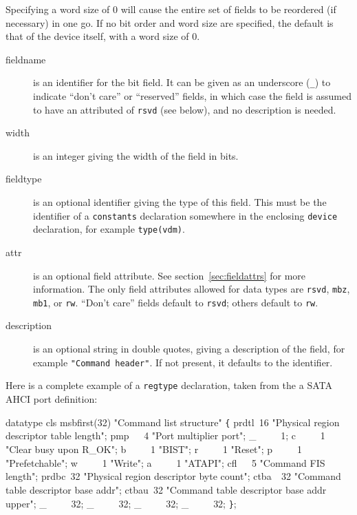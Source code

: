 \documentclass[a4paper,11pt,twoside]{report}
\begin{document}
Specifying a word size of 0 will cause the entire set of fields to be
reordered (if necessary) in one go.  If no bit order and word size are
specified, the default is that of the device itself, with a word size
of 0. 

\begin{description}

\item[fieldname] is an identifier for the bit field.  It can be
  given as an underscore (\texttt{\_}) to indicate ``don't care'' or
  ``reserved'' fields, in which case the field is
  assumed to have an attributed of \texttt{rsvd} (see below), and no
  description is needed. 

\item[width] is an integer giving the width of the field in bits. 

\item[fieldtype] is an optional identifier giving the type of this field.
  This must be the identifier of a \texttt{constants} declaration
  somewhere in the enclosing \texttt{device} declaration, for example
  \texttt{type(vdm)}. 

\item[attr] is an optional field
  attribute.  See section~\ref{sec:fieldattrs} for more information.
  The only field attributes allowed for data types are \texttt{rsvd},
  \texttt{mbz}, \texttt{mb1}, or \texttt{rw}.  ``Don't care'' fields
  default to \texttt{rsvd}; others default to \texttt{rw}. 

\item[description] is an optional string in double quotes, giving a
  description of the field, for example \texttt{"Command header"}. 
  If not present, it defaults to the identifier.  

\end{description}

Here is a complete example of a \texttt{regtype} declaration, taken from the
a SATA AHCI port definition: 
\begin{example}
  datatype cls msbfirst(32) "Command list structure" \verb+{+
      prdtl\verb+ +16 "Physical region descriptor table length";
      pmp\verb+   +4  "Port multiplier port";
      \_\verb+     +1;
      c\verb+     +1 "Clear busy upon R\_OK";
      b\verb+     +1 "BIST";
      r\verb+     +1 "Reset";
      p\verb+     +1 "Prefetchable";
      w\verb+     +1 "Write";
      a\verb+     +1 "ATAPI";
      cfl\verb+   +5 "Command FIS length";
      prdbc\verb+ +32 "Physical region descriptor byte count";
      ctba\verb+  +32 "Command table descriptor base addr";
      ctbau\verb+ +32 "Command table descriptor base addr upper";
      \_\verb+     +32;
      \_\verb+     +32;
      \_\verb+     +32;
      \_\verb+     +32;
  \verb+}+;
\end{example}
\end{document}
